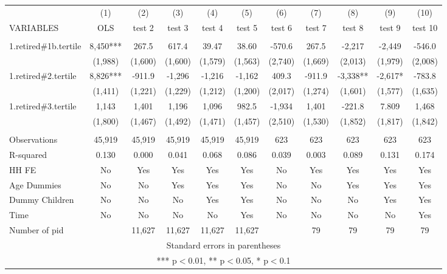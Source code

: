 \begin{tabular}{lcccccccccc} \hline
 & (1) & (2) & (3) & (4) & (5) & (6) & (7) & (8) & (9) & (10) \\
VARIABLES & OLS & test 2 & test 3 & test 4 & test 5 & test 6 & test 7 & test 8 & test 9 & test 10 \\ \hline
 &  &  &  &  &  &  &  &  &  &  \\
1.retired\#1b.tertile & 8,450*** & 267.5 & 617.4 & 39.47 & 38.60 & -570.6 & 267.5 & -2,217 & -2,449 & -546.0 \\
 & (1,988) & (1,600) & (1,600) & (1,579) & (1,563) & (2,740) & (1,669) & (2,013) & (1,979) & (2,008) \\
1.retired\#2.tertile & 8,826*** & -911.9 & -1,296 & -1,216 & -1,162 & 409.3 & -911.9 & -3,338** & -2,617* & -783.8 \\
 & (1,411) & (1,221) & (1,229) & (1,212) & (1,200) & (2,017) & (1,274) & (1,601) & (1,577) & (1,635) \\
1.retired\#3.tertile & 1,143 & 1,401 & 1,196 & 1,096 & 982.5 & -1,934 & 1,401 & -221.8 & 7.809 & 1,468 \\
 & (1,800) & (1,467) & (1,492) & (1,471) & (1,457) & (2,510) & (1,530) & (1,852) & (1,817) & (1,842) \\
 &  &  &  &  &  &  &  &  &  &  \\
Observations & 45,919 & 45,919 & 45,919 & 45,919 & 45,919 & 623 & 623 & 623 & 623 & 623 \\
R-squared & 0.130 & 0.000 & 0.041 & 0.068 & 0.086 & 0.039 & 0.003 & 0.089 & 0.131 & 0.174 \\
HH FE & No & Yes & Yes & Yes & Yes & No & Yes & Yes & Yes & Yes \\
Age Dummies & No & No & Yes & Yes & Yes & No & No & Yes & Yes & Yes \\
Dummy Children & No & No & No & Yes & Yes & No & No & No & Yes & Yes \\
Time & No & No & No & No & Yes & No & No & No & No & Yes \\
 Number of pid &  & 11,627 & 11,627 & 11,627 & 11,627 &  & 79 & 79 & 79 & 79 \\ \hline
\multicolumn{11}{c}{ Standard errors in parentheses} \\
\multicolumn{11}{c}{ *** p$<$0.01, ** p$<$0.05, * p$<$0.1} \\
\end{tabular}
